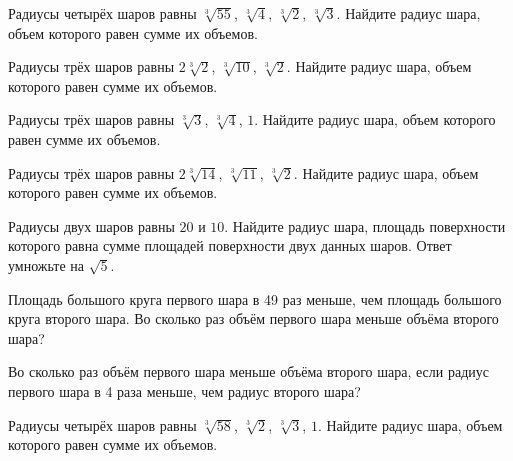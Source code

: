 \documentclass[a4paper]{article}
\begin{document}
\begin{taskBN}{1}
Радиусы четырёх шаров равны $\sqrt[3]{55}$, $\sqrt[3]{4}$, $\sqrt[3]{2}$, $\sqrt[3]{3}$. Найдите радиус шара, объем которого равен сумме их объемов.
\end{taskBN}

\begin{taskBN}{2}
Радиусы трёх шаров равны $2\sqrt[3]{2}$, $\sqrt[3]{10}$, $\sqrt[3]{2}$. Найдите радиус шара, объем которого равен сумме их объемов.
\end{taskBN}

\begin{taskBN}{3}
Радиусы трёх шаров равны $\sqrt[3]{3}$, $\sqrt[3]{4}$, $1$. Найдите радиус шара, объем которого равен сумме их объемов.
\end{taskBN}

\begin{taskBN}{4}
Радиусы трёх шаров равны $2\sqrt[3]{14}$, $\sqrt[3]{11}$, $\sqrt[3]{2}$. Найдите радиус шара, объем которого равен сумме их объемов.
\end{taskBN}

\begin{taskBN}{5}
Радиусы двух шаров равны $20$ и $10$. Найдите радиус шара, площадь поверхности которого равна сумме площадей поверхности двух данных шаров. Ответ умножьте на $\sqrt{5}$.
\end{taskBN}

\begin{taskBN}{6}
Площадь большого круга первого шара в 49 раз меньше, чем площадь большого круга второго шара. Во сколько раз объём первого шара меньше объёма второго шара?
\end{taskBN}

\begin{taskBN}{7}
Во сколько раз объём первого шара меньше объёма второго шара, если радиус первого шара в 4 раза меньше, чем радиус второго шара?
\end{taskBN}

\begin{taskBN}{8}
Радиусы четырёх шаров равны $\sqrt[3]{58}$, $\sqrt[3]{2}$, $\sqrt[3]{3}$, $1$. Найдите радиус шара, объем которого равен сумме их объемов.
\end{taskBN}
\end{document}
